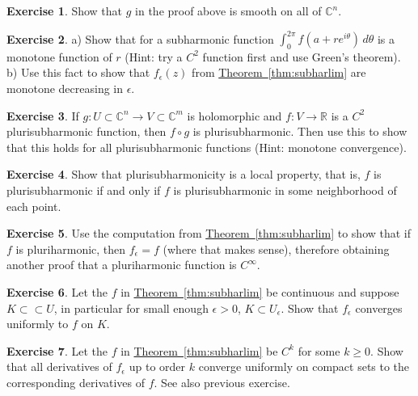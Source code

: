 \documentclass[12pt,openany]{book}
\newcommand{\C}{{\mathbb{C}}}
\newcommand{\R}{{\mathbb{R}}}
\theoremstyle{plain}
\theoremstyle{remark}
\theoremstyle{definition}
\newenvironment{exbox}{%
    \def\FrameCommand{\vrule width 1pt \relax\hspace {10pt}}%
    \MakeFramed {\advance \hsize -\width \FrameRestore }%
}{%
    \endMakeFramed
}
\theoremstyle{exercise}
\newtheorem{exercise}{Exercise}[section]
\theoremstyle{example}
\newcommand{\thmref}[1]{\hyperref[#1]{Theorem~\ref*{#1}}}
\begin{document}
\begin{exbox}
\begin{exercise}
Show that $g$ in the proof above is smooth on all of $\C^n$.
\end{exercise}

\begin{exercise}
a) Show that for a subharmonic function $\int_0^{2\pi} f(a+re^{i\theta}) \,
d\theta$ is a monotone function of $r$ (Hint: try a $C^2$ function first and
use Green's theorem).  b) Use this
fact to show that $f_\epsilon(z)$ from \thmref{thm:subharlim} are monotone
decreasing in $\epsilon$.
\end{exercise}

\begin{exercise}
If $g \colon U \subset \C^n \to V \subset \C^m$ is holomorphic and $f
\colon V \to \R$ is a $C^2$ plurisubharmonic function, then 
$f \circ g$ is plurisubharmonic.
Then use this to show that
this holds for all plurisubharmonic functions (Hint: monotone convergence).
\end{exercise}

\begin{exercise}
Show that plurisubharmonicity is a local property, that is,
$f$ is plurisubharmonic if and only if $f$ is plurisubharmonic in
some neighborhood of each point.
\end{exercise}

\begin{exercise}
Use the computation from
\thmref{thm:subharlim} to show that if $f$ is pluriharmonic, then
$f_\epsilon = f$ (where that makes sense), therefore obtaining another proof that 
a pluriharmonic function is $C^\infty$.
\end{exercise}

\begin{exercise}
Let the $f$ in \thmref{thm:subharlim} be continuous and suppose $K \subset
\subset U$, in particular for small enough $\epsilon >0$, $K \subset U_\epsilon$.
Show that $f_\epsilon$ converges uniformly to $f$ on $K$.
\end{exercise}

\begin{exercise}
Let the $f$ in \thmref{thm:subharlim} be $C^k$ for some $k \geq 0$.
Show that all derivatives of $f_\epsilon$ up to order $k$ converge uniformly
on compact sets to the corresponding derivatives of $f$.  See also previous
exercise.
\end{exercise}
\end{exbox}
\end{document}

